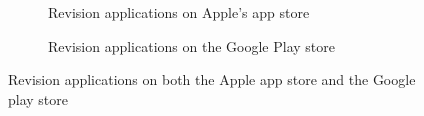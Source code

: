 \documentclass{article}
\begin{document}
\begin{figure}[H]
	\centering
	\begin{subfigure}{0.8\textwidth}
		\caption{Revision applications on Apple's app store}
	\end{subfigure}
	\hfill
	\begin{subfigure}{0.8\textwidth}
		\caption{Revision applications on the Google Play store}
	\end{subfigure}
	\caption{Revision applications on both the Apple app store and the Google play store}
	\label{figure:appStoreApps}
\end{figure}
\end{document}

